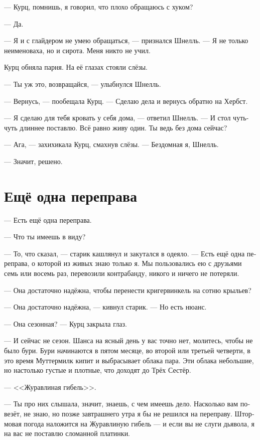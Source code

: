 \documentclass[a4paper,12pt,fleqn]{book}\usepackage{cooltooltips}\usepackage{polyglossia}\setdefaultlanguage[babelshorthands=true]{russian}\setotherlanguage{english}\defaultfontfeatures{Ligatures=TeX,Mapping=tex-text} \usepackage{xcolor}\definecolor{lightgray}{HTML}{bbbbbb}\color{lightgray}\newcommand{\ml}[3]{\textenglish{\textcolor{black}{#3}}}
\begin{document}
--- Курц, помнишь, я говорил, что плохо обращаюсь с хуком?

--- Да.

--- Я и с глайдером не умею обращаться, --- признался Шнелль.
--- Я не только неименоваха, но и сирота.
Меня никто не учил.

Курц обняла парня.
На её глазах стояли слёзы.

--- Ты уж это, возвращайся, --- улыбнулся Шнелль.

--- Вернусь, --- пообещала Курц.
--- Сделаю дела и вернусь обратно на Хербст.

--- Я сделаю для тебя кровать у себя дома, --- ответил Шнелль.
--- И стол чуть-чуть длиннее поставлю.
Всё равно живу один.
Ты ведь без дома сейчас?

--- Ага, --- захихикала Курц, смахнув слёзы.
--- Бездомная я, Шнелль.

--- Значит, решено.

\section{Ещё одна переправа}

--- Есть ещё одна переправа.

--- Что ты имеешь в виду?

--- То, что сказал, --- старик кашлянул и закутался в одеяло.
--- Есть ещё одна переправа, о которой из живых знаю только я.
Мы пользовались ею с друзьями семь или восемь раз, перевозили контрабанду, никого и ничего не потеряли.

--- Она достаточно надёжна, чтобы перенести кригервинкель на сотню крыльев?

--- Она достаточно надёжна, --- кивнул старик.
--- Но есть нюанс.

--- Она сезонная? --- Курц закрыла глаз.

--- И сейчас не сезон.
Шанса на ясный день у вас точно нет, молитесь, чтобы не было бури.
Бури начинаются в пятом месяце, во второй или третьей четверти, в это время Муттермилк кипит и выбрасывает облака пара.
Эти облака небольшие, но настолько густые и плотные, что доходят до Трёх Сестёр.

--- <<Журавлиная гибель>>.

--- Ты про них слышала, значит, знаешь, с чем имеешь дело.
Насколько вам повезёт, не знаю, но позже завтрашнего утра я бы не решился на переправу.
Штормовая погода наложится на Журавлиную гибель --- и если вы не слуги дьявола, я на вас не поставлю сломанной платинки.
\end{document}
